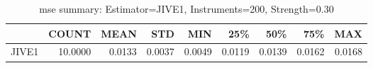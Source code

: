 \begin{table}[ht]
\centering
\caption{mse summary: Estimator=JIVE1, Instruments=200, Strength=0.30}
\begin{tabular}{lrrrrrrrr}
\toprule
 & COUNT & MEAN & STD & MIN & 25\% & 50\% & 75\% & MAX \\
\midrule
JIVE1 & 10.0000 & 0.0133 & 0.0037 & 0.0049 & 0.0119 & 0.0139 & 0.0162 & 0.0168 \\
\bottomrule
\end{tabular}
\end{table}
